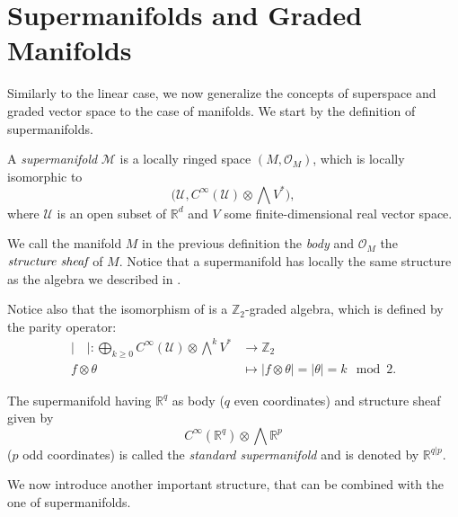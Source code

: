 \section{Supermanifolds and Graded Manifolds}
\label{sec:supermanifolds}

Similarly to the linear case, we now generalize the concepts of superspace and graded vector space to the case of manifolds.
We start by the definition of supermanifolds.

\begin{definition}
\label{def:supermanifold}
    A \emph{supermanifold} $\mathcal{M}$ is a locally ringed space $(M, \mathcal{O}_M)$, which is locally isomorphic to
    \begin{equation*}
        \Big(\mathcal{U}, C^\infty(\mathcal{U}) \otimes \bigwedge V^*\Big),
    \end{equation*}
    where $\mathcal{U}$ is an open subset of $\mathbb{R}^d$ and $V$ some finite-dimensional real vector space.
\end{definition}

We call the manifold $M$ in the previous definition the \emph{body} and $\mathcal{O}_M$ the $\emph{structure sheaf}$ of $M$.
Notice that a supermanifold has locally the same structure as the algebra we described in .

Notice also that the isomorphism of  is a $\mathbb{Z}_2$-graded algebra, which is defined by the parity operator:
\begin{align*}
    |\quad | : 
    \bigoplus_{k \geq 0} C^\infty(\mathcal{U}) \otimes \bigwedge^k V^* 
    &\rightarrow \mathbb{Z}_2 \\
    f \otimes \theta &
    \mapsto |f \otimes \theta| = |\theta| = k \! \! \mod{2}.
\end{align*}

\begin{example}
    The supermanifold having $\mathbb{R}^q$ as body ($q$ even coordinates) and structure sheaf given by
    \begin{equation*}
         C^\infty(\mathbb{R}^q) \otimes \bigwedge \mathbb{R}^p
    \end{equation*}
    ($p$ odd coordinates) is called the \emph{standard supermanifold} and is denoted by $\mathbb{R}^{q|p}$.
\end{example}

We now introduce another important structure, that can be combined with the one of supermanifolds.

